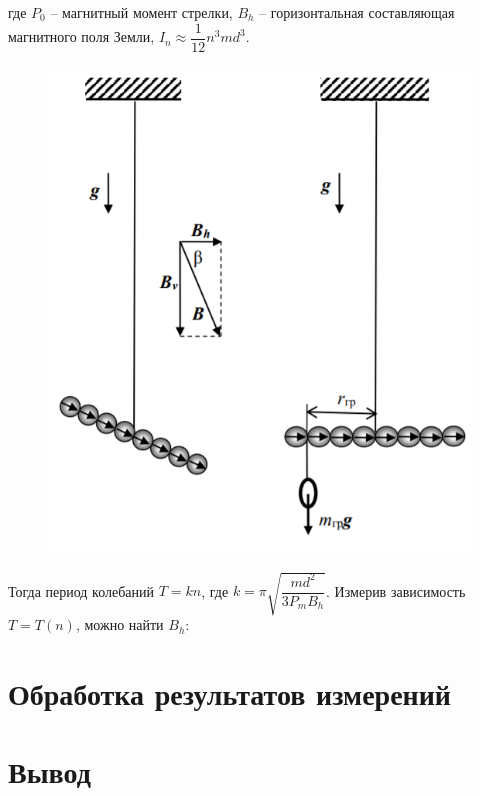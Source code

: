 где $P_0$ -- магнитный момент стрелки, $B_h$ -- горизонтальная составляющая магнитного поля Земли, $I_n \approx \dfrac{1}{12}n^3 m d^3$.
\begin{figure}
\includegraphics[scale=0.5]{2.png}
\end{figure}
\n\n
Тогда период колебаний $T = kn$, где $k = \pi \sqrt{\dfrac{md^2}{3P_m B_h}}$. Измерив зависимость $T=T(n)$, можно найти $B_h$:


	\section*{Обработка результатов измерений}
	
	\section*{Вывод}
	
